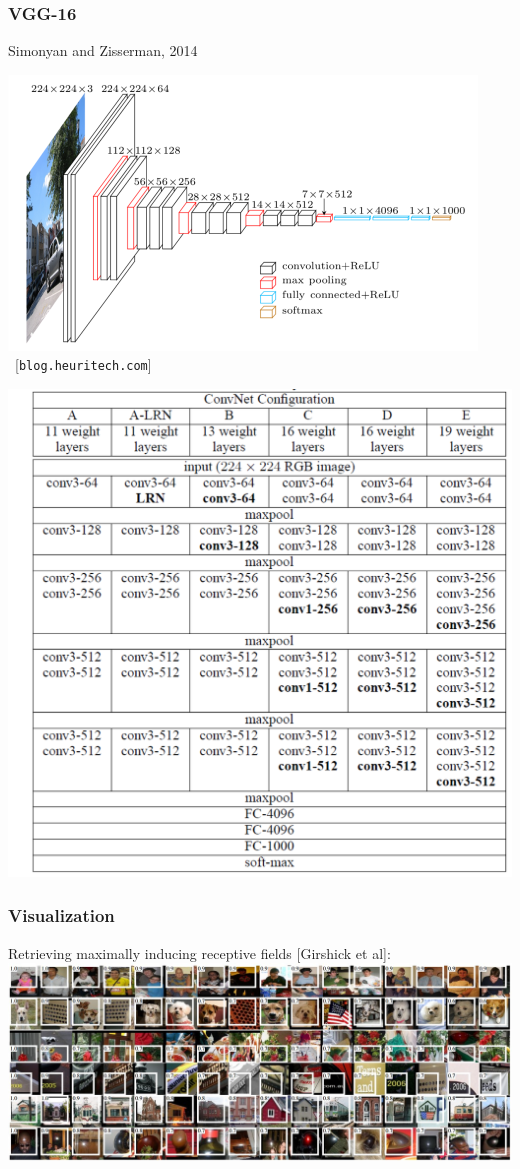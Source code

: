 \documentclass[xcolor=dvipsnames]{beamer}
\begin{document}
\begin{frame}
  \frametitle{VGG-16}
  \begin{minipage}[c]{.5\linewidth}
  \bi
\item Simonyan and Zisserman, 2014
\ei

\includegraphics[width=.9\textwidth]{vgg16}\\
~[{\tt blog.heuritech.com}]
  \end{minipage}%
  \begin{minipage}[c]{.5\linewidth}
    \includegraphics[width=.9\textwidth]{vgg16-table}    
  \end{minipage}

\end{frame}

\begin{frame}
  \frametitle{Visualization}
  \bi
\item Retrieving maximally inducing receptive fields [Girshick et al]:
\ei
\includegraphics[width=.99\textwidth]{pool5max}
\end{frame}
\end{document}
